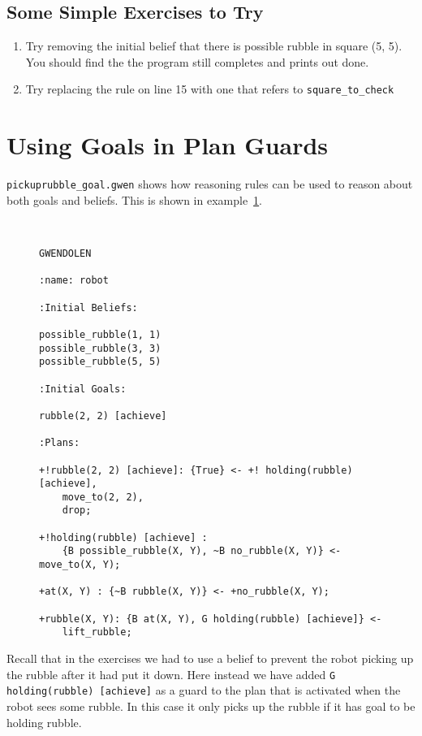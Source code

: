 \subsection{Some Simple Exercises to Try}
\begin{enumerate}
\item Try removing the initial belief that there is possible rubble in
  square (5, 5).  You should find the the program still completes and
  prints out done. 
\item Try replacing the rule on line 15 with one that refers to \lstinline{square_to_check}
\end{enumerate}



\section{Using Goals in Plan Guards}

\texttt{pickuprubble\_goal.gwen} shows how reasoning
rules can be used to reason about both goals
and beliefs.  This is shown in
example~\ref{code:pickuprubble_goal}. 
\begin{figure}[htb]
\begin{ourexample}
\label{code:pickuprubble_goal} \quad \\
\begin{lstlisting}[basicstyle=\sffamily,style=easslisting,language=Gwendolen]
GWENDOLEN

:name: robot

:Initial Beliefs:

possible_rubble(1, 1)
possible_rubble(3, 3)
possible_rubble(5, 5)

:Initial Goals:

rubble(2, 2) [achieve]

:Plans:

+!rubble(2, 2) [achieve]: {True} <- +! holding(rubble)[achieve],
    move_to(2, 2), 
    drop;

+!holding(rubble) [achieve] : 
    {B possible_rubble(X, Y), ~B no_rubble(X, Y)} <- move_to(X, Y);

+at(X, Y) : {~B rubble(X, Y)} <- +no_rubble(X, Y);

+rubble(X, Y): {B at(X, Y), G holding(rubble) [achieve]} <- 
    lift_rubble;
\end{lstlisting}
\end{ourexample}
\end{figure}
Recall that in the exercises
 we had to use a
belief to prevent the robot picking up the rubble after it had put it
down.  Here instead we have added \lstinline{G holding(rubble) [achieve]} as a guard to the plan that is activated when the robot sees some rubble.  In this case it only picks up the rubble if it has goal to be holding rubble. 

